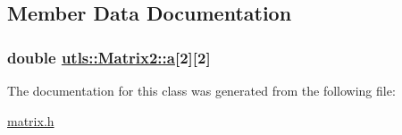 \subsection{Member Data Documentation}
\hypertarget{classutls_1_1Matrix2_175b19b6eeaaa8cba29e9155c5bfa0d7}{
\subsubsection[a]{\setlength{\rightskip}{0pt plus 5cm}double \hyperlink{classutls_1_1Matrix2_175b19b6eeaaa8cba29e9155c5bfa0d7}{utls::Matrix2::a}\mbox{[}2\mbox{]}\mbox{[}2\mbox{]}}}
\label{classutls_1_1Matrix2_175b19b6eeaaa8cba29e9155c5bfa0d7}




The documentation for this class was generated from the following file:\begin{CompactItemize}
\item 
\hyperlink{matrix_8h}{matrix.h}\end{CompactItemize}
